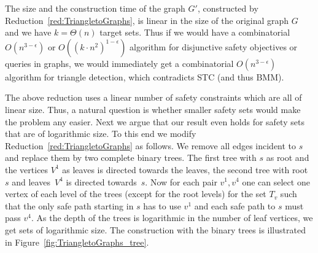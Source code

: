\documentclass[11pt,letterpaper]{article}
\newcommand{\target}{T\xspace}
\begin{document}
The size and the construction time of the graph $G'$, constructed 
by Reduction~\ref{red:TriangletoGraphs}, is linear in the size of the 
original graph $G$ and we have $k = \Theta(n)$ target sets.
Thus if we would have a combinatorial $O(n^{3-\epsilon})$  or $O((k\cdot n^2)^{1-\epsilon})$ algorithm for disjunctive 
safety objectives or queries in graphs, we
would immediately get a combinatorial  $O(n^{3-\epsilon})$ algorithm for triangle detection, which contradicts STC (and thus BMM).

The above reduction uses a linear number of safety constraints which are all of linear size. 
Thus, a natural question is whether smaller safety sets would make the problem any easier. 
Next we argue that our result even holds for safety sets that are of logarithmic size.
To this end we modify Reduction~\ref{red:TriangletoGraphs} as follows. We remove all edges incident to $s$ and 
replace them by two complete binary trees. The first tree with $s$ as root and the vertices $V^1$ as leaves is directed towards the leaves, 
the second tree with root~$s$ and leaves~$V^4$ is directed towards~$s$.
Now for each pair $v^1,v^4$ one can select one vertex of each level of the trees (except for the root levels) 
for the set $\target_v$ such that the only safe path starting in $s$ has to use 
$v^1$ and each safe path to $s$ must pass $v^4$.
As the depth of the trees is logarithmic in the number of leaf vertices, we get
sets of logarithmic size. 
The construction with the binary trees 
is illustrated in Figure~\ref{fig:TriangletoGraphs_tree}.
\end{document}
